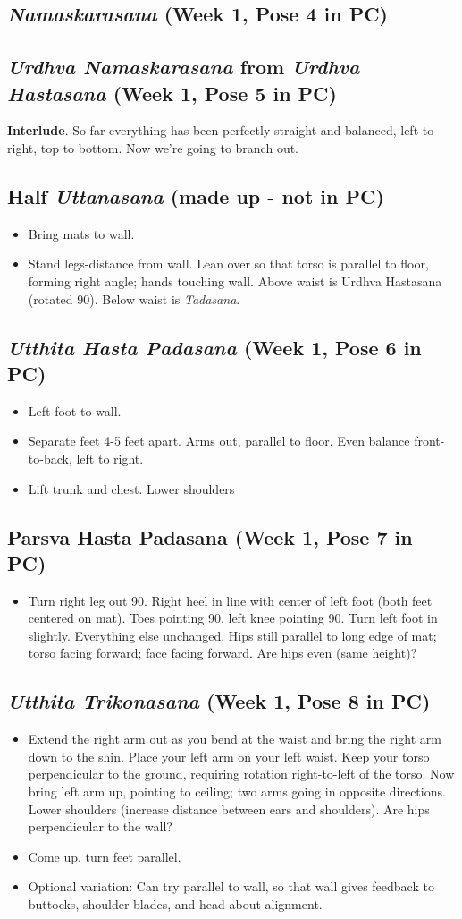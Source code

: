 \documentclass{book}
\newcommand{\apose}[1]{\emph{#1}}
\newcommand{\nam}{\apose{Namaskarasana}}
\newcommand{\parshastpad}{Parsva Hasta Padasana}
\newcommand{\tad}{\apose{Tadasana}}
\newcommand{\urdhast}{\apose{Urdhva Hastasana}}
\newcommand{\urdnam}{\apose{Urdhva Namaskarasana}}
\newcommand{\utt}{\apose{Uttanasana}}
\newcommand{\utthastpad}{\apose{Utthita Hasta Padasana}}
\newcommand{\utttrik}{\apose{Utthita Trikonasana}}
\newcommand{\PC}[2]{{\normalfont \hfill(Week #1, Pose #2 in PC)}}
\newcommand{\newpose}[1]{{{#1}}}
\newcounter{pose}
\newcommand{\pose}{\subsection}
\begin{document}
\pose{\newpose{\nam{}} \PC{1}{4}}

\pose{\newpose{\urdnam{}} from \urdhast{} \PC{1}{5}}


\textbf{Interlude}. So far everything has been perfectly straight and
balanced, left to right, top to bottom. Now we're going to branch out.

\pose{\newpose{Half \utt} (made up - not in PC)}

  \begin{itemize}
  \item Bring mats to wall.
  \item Stand legs-distance from wall. Lean over so that torso is
    parallel to floor, forming right angle; hands touching wall. Above
    waist is Urdhva Hastasana (rotated 90\textdegree). Below waist is \tad.
  \end{itemize}

\pose{\newpose{\utthastpad} \PC{1}{6}}

  \begin{itemize}
  \item Left foot to wall.
  \item Separate feet 4-5 feet apart. Arms out, parallel to
    floor. Even balance front-to-back, left to right.
  \item Lift trunk and chest. Lower shoulders
  \end{itemize}

\pose{\newpose{\parshastpad} \PC{1}{7}}

  \begin{itemize}
  \item Turn right leg out 90\textdegree. Right heel in line with
    center of left foot (both feet centered on mat). Toes pointing
    90\textdegree, left knee pointing 90\textdegree. Turn left foot in
    slightly. Everything else unchanged. Hips still parallel to long
    edge of mat; torso facing forward; face facing forward. Are hips
    even (same height)?
  \end{itemize}

\pose{\newpose{\utttrik} \PC{1}{8}}

  \begin{itemize}
  \item Extend the right arm out as you bend at the waist and bring
    the right arm down to the shin. Place your left arm on your left
    waist. Keep your torso perpendicular to the ground, requiring
    rotation right-to-left of the torso. Now bring left arm up,
    pointing to ceiling; two arms going in opposite directions. Lower
    shoulders (increase distance between ears and shoulders). Are hips
    perpendicular to the wall?
  \item Come up, turn feet parallel.
  \item Optional variation: Can try parallel to wall, so that wall
    gives feedback to buttocks, shoulder blades, and head about
    alignment.
  \end{itemize}
\end{document}
